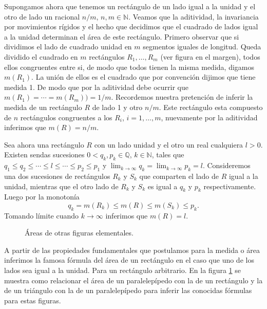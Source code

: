 Supongamos ahora que tenemos un rectángulo de un lado igual a la unidad y el otro de lado un racional $n/m$, $n,m\in\mathbb{N}$. Veamos que la aditividad, la invariancia por movimientos rígidos y el hecho que decidimos que el cuadrado de lados igual a la unidad determinan el área de este rectángulo. Primero observar que si dividimos el lado de cuadrado unidad en $m$ segmentos iguales de longitud. 
Queda dividido el cuadrado en $m$ rectángulos $R_1,\ldots,R_m$ (ver figura en el margen), todos ellos  congruentes entre si, de modo que todos tienen la misma medida, digamos $m(R_1)$. La unión de ellos es el cuadrado que por convención dijimos que tiene medida 1. De modo que por la aditividad debe ocurrir que $m(R_1)=\cdots =m(R_m))=1/m$. Recordemos nuestra pretención de inferir la medida de un rectángulo $R$ de lado 1 y otro $n/m$. Este rectángulo esta compuesto de $n$ rectángulos congruentes a los $R_i$, $i=1,\ldots,m$, nuevamente por la aditividad inferimos que $m(R)=n/m$. 

Sea ahora una rectángulo $R$ con un lado unidad y el otro un real cualquiera $l>0$. Existen sendas sucesiones $0<q_k,p_k\in\mathbb{Q}$, $k\in\mathbb{N}$, tales que $q_1\leq q_2\leq\cdots \leq l \leq \cdots\leq p_2\leq p_1$ y $\lim_{k\to\infty}q_k =\lim_{k\to\infty} p_k=l$. Consideremos una dos sucesiones de rectángulos $R_k$ y $S_k$ que comparten el lado de $R$ igual a la unidad, mientras que el otro lado de $R_k$ y $S_k$ es igual a $q_k$ y $p_k$ respectivamente. Luego por la monotonía
\[
 q_k=m(R_k)\leq m(R) \leq m(S_k)\leq p_k.
\]
Tomando límite cuando $k\to\infty$ inferimos que $m(R)=l$. 



\begin{figure}[h]
 \begin{center}
  
 \end{center}
 \caption{Áreas de otras figuras elementales.}\label{fig:paral-trig}
\end{figure}


A partir de las propiedades fundamentales que postulamos para la medida o área inferimos la famosa fórmula del área de un rectángulo en el caso que uno de los lados sea igual a la unidad. Para un  rectángulo arbitrario. En la figura \ref{fig:paral-trig} se muestra como relacionar el área de un paralelepípedo con la de un rectángulo y la de un triángulo con la de un paralelepípedo para inferir las conocidas fórmulas para estas figuras.



